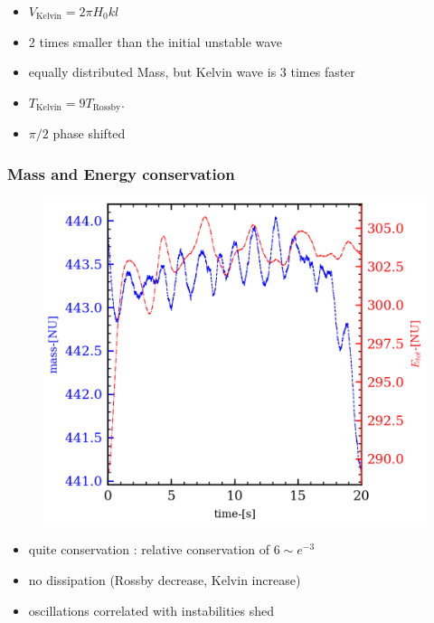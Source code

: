 \documentclass[numbering=fraction]{beamer}
\begin{document}
\begin{frame}
    \begin{minipage}{.58\linewidth}
        \begin{itemize}
            \item $V_{\text{Kelvin}} = 2 \pi H_0 kl$
            \item 2 times smaller than the initial unstable wave
            \item equally distributed Mass, but Kelvin wave is 3 times faster
            \item $T_{\text{Kelvin}} = 9 T_{\text{Rossby}}$.
            \item $\pi / 2$ phase shifted
        \end{itemize}
    \end{minipage}
\end{frame}

\begin{frame}
    \frametitle{Mass and Energy conservation}
    \begin{minipage}{.7\linewidth}
        \begin{figure}[H]
            \centering
            \includegraphics[width=\linewidth]{./figure/energy_common_wave.png}
        \end{figure}
    \end{minipage}
    \begin{minipage}{.28\linewidth}
        \begin{itemize}
            \item quite conservation : relative conservation of $6\sim e^{-3}$
            \item no dissipation (Rossby decrease, Kelvin increase)
            \item oscillations correlated with instabilities shed
        \end{itemize}
    \end{minipage}
\end{frame}
\end{document}
